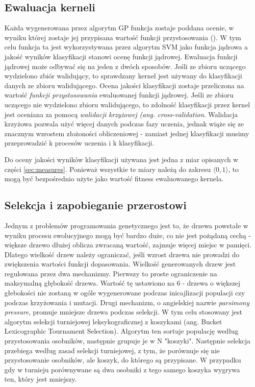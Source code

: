 \subsection{Ewaluacja kerneli}\label{sec:ewaluacja}
Każda wygenerowana przez algorytm GP funkcja zostaje poddana ocenie, w wyniku której zostaje jej przypisana wartość funkcji przystosowania (). W tym celu funkcja ta jest wykorzystywana przez algorytm SVM jako funkcja jądrowa a jakość wyników klasyfikacji stanowi ocenę funkcji jądrowej.
Ewaluacja funkcji jądrowej może odbywać się na jeden z dwóch sposobów. Jeśli ze zbioru uczącego wydzielono  zbiór walidujący, to sprawdzany kernel jest używany do klasyfikacji danych ze zbioru walidującego. Ocena jakości klasyfikacji zostaje przeliczona na wartość \textit{ funkcji przystosowania} ewaluowanej funkcji jądrowej.
Jeśli ze zbioru uczącego nie wydzielono zbioru walidującego, to zdolność klasyfikacji przez kernel jest oceniana za pomocą \textit{walidacji krzyżowej (ang. cross-validation}.
Walidacja krzyżowa pozwala użyć więcej danych podczas fazy uczenia, jednak wiąże się ze znacznym wzrostem złożoności obliczeniowej - zamiast jednej klasyfikacji musimy przeprowadzić k procesów uczenia i k klasyfikacji.

Do oceny jakości wyników klasyfikacji używana jest jedna z miar opisanych w części \ref{sec:measures}. Ponieważ wszystkie te miary należą do zakresu $ \langle 0,1 \rangle $, to mogą być bezpośrednio użyte jako wartość fitness ewaluowanego kernela.

\subsection{Selekcja i zapobieganie przerostowi}
Jednym z problemów programowania genetycznego jest to, że drzewa powstałe w wyniku procesu ewolucyjnego mogą być bardzo duże, co nie jest pożądaną cechą - większe drzewo dłużej oblicza zwracaną wartość, zajmuje więcej miejsc w pamięci. Dlatego wielkość drzew należy ograniczać, jeśli wzrost drzewa nie prowadzi do zwiększenia wartości funkcji dopasowania.
Wielkość generowanych drzew jest regulowana przez dwa mechanizmy. Pierwszy to proste ograniczenie na maksymalną głębokość drzewa. Wartość tę ustawiono na 6 - drzewa o większej głebokości nie zostaną w ogóle wygenerowane podczas inicajlizacji populacji czy podczas krzyżowania i mutacji. Drugi mechanizm, o angielskiej nazwie \textit{parsimony pressure},  promuje mniejsze drzewa podczas selekcji. W tym celu stosowany jest algorytm selekcji turniejowej leksykograficznej z koszykami (ang. Bucket Lexicographic
 Tournament Selection). Algorytm ten sortuje populację według przystosowania osobników, następnie grupuje je w N "koszyki". Następnie selekcja przebiega według zasad selekcji turniejowej, z tym, że porównuje się nie przystosowanie osobników, ale koszyk, do którego są przypisane. W przypadku gdy w turnieju porównywane są dwa osobniki z tego samego koszyka wygrywa ten, który jest mniejszy.

